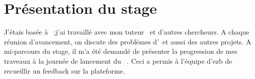 \section{Présentation du stage}

J'étais basée à \msh\ ;j'ai travaillé avec mon tuteur \tls\ et d'autres chercheurs. A chaque réunion d'avancement, on discute  des problèmes d'\ezb\ et aussi des autres projets. A mi-parcours du stage, il m'a été demandé de présenter la progression de mes traveaux à la journée de lancement du \pe\ . Ceci a permis à l'équipe d'ezb de recueillir un feedback sur la plateforme.